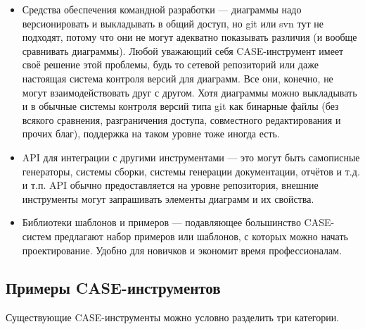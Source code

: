 \documentclass[a5paper]{article}
\begin{document}
\begin{itemize}
    \item Средства обеспечения командной разработки --- диаграммы надо версионировать и выкладывать в общий доступ, но git или svn тут не подходят, потому что они не могут адекватно показывать различия (и вообще сравнивать диаграммы). Любой уважающий себя CASE-инструмент имеет своё решение этой проблемы, будь то сетевой репозиторий или даже настоящая система контроля версий для диаграмм. Все они, конечно, не могут взаимодействовать друг с другом. Хотя диаграммы можно выкладывать и в обычные системы контроля версий типа git как бинарные файлы (без всякого сравнения, разграничения доступа, совместного редактирования и прочих благ), поддержка на таком уровне тоже иногда есть.
    \item API для интеграции с другими инструментами --- это могут быть самописные генераторы, системы сборки, системы генерации документации, отчётов и т.д. и т.п. API обычно предоставляется на уровне репозитория, внешние инструменты могут запрашивать элементы диаграмм и их свойства.
    \item Библиотеки шаблонов и примеров --- подавляющее большинство CASE-систем предлагают набор примеров или шаблонов, с которых можно начать проектирование. Удобно для новичков и экономит время профессионалам.
\end{itemize}

\subsection{Примеры CASE-инструментов}

Существующие CASE-инструменты можно условно разделить три категории.
\end{document}
